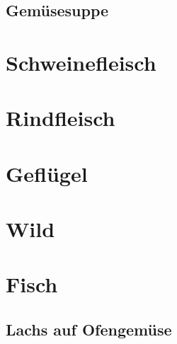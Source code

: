 \documentclass[ngerman,11pt,parskip=half,a5paper,twoside]{scrbook}
\begin{document}
	\section{Gemüsesuppe} 
	 
	\clearpage

\chapter{Schweinefleisch}

\clearpage

\chapter{Rindfleisch}

\clearpage

\chapter{Geflügel}

\clearpage

\chapter{Wild}

\clearpage

\chapter{Fisch}

\clearpage

	\section{Lachs auf Ofengemüse}
	
	\clearpage
\end{document}
